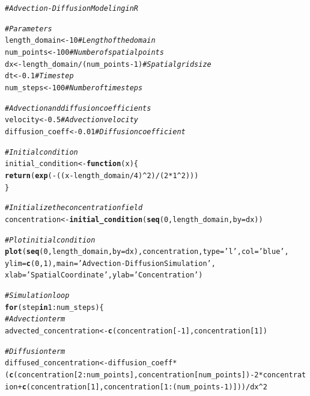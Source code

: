 \documentclass{tufte-handout}\usepackage[]{graphicx}\usepackage[]{xcolor}
\makeatletter
\newcommand{\hlnum}[1]{\textcolor[rgb]{0.686,0.059,0.569}{#1}}%
\newcommand{\hlstr}[1]{\textcolor[rgb]{0.192,0.494,0.8}{#1}}%
\newcommand{\hlcom}[1]{\textcolor[rgb]{0.678,0.584,0.686}{\textit{#1}}}%
\newcommand{\hlopt}[1]{\textcolor[rgb]{0,0,0}{#1}}%
\newcommand{\hlstd}[1]{\textcolor[rgb]{0.345,0.345,0.345}{#1}}%
\newcommand{\hlkwa}[1]{\textcolor[rgb]{0.161,0.373,0.58}{\textbf{#1}}}%
\newcommand{\hlkwb}[1]{\textcolor[rgb]{0.69,0.353,0.396}{#1}}%
\newcommand{\hlkwc}[1]{\textcolor[rgb]{0.333,0.667,0.333}{#1}}%
\newcommand{\hlkwd}[1]{\textcolor[rgb]{0.737,0.353,0.396}{\textbf{#1}}}%
\newenvironment{kframe}{%
 \def\at@end@of@kframe{}%
 \ifinner\ifhmode%
  \def\at@end@of@kframe{\end{minipage}}%
  \begin{minipage}{\columnwidth}%
 \fi\fi%
 \def\FrameCommand##1{\hskip\@totalleftmargin \hskip-\fboxsep
 \colorbox{shadecolor}{##1}\hskip-\fboxsep
     \hskip-\linewidth \hskip-\@totalleftmargin \hskip\columnwidth}%
 \MakeFramed {\advance\hsize-\width
   \@totalleftmargin\z@ \linewidth\hsize
   \@setminipage}}%
 {\par\unskip\endMakeFramed%
 \at@end@of@kframe}
\newenvironment{knitrout}{}{} %
\makeatother
\begin{document}
\begin{knitrout}
\color{fgcolor}\begin{kframe}
\begin{alltt}
\hlcom{# Advection-Diffusion Modeling in R}

\hlcom{# Parameters}
\hlstd{length_domain} \hlkwb{<-} \hlnum{10}  \hlcom{# Length of the domain}
\hlstd{num_points} \hlkwb{<-} \hlnum{100}    \hlcom{# Number of spatial points}
\hlstd{dx} \hlkwb{<-} \hlstd{length_domain} \hlopt{/} \hlstd{(num_points} \hlopt{-} \hlnum{1}\hlstd{)}  \hlcom{# Spatial grid size}
\hlstd{dt} \hlkwb{<-} \hlnum{0.1}            \hlcom{# Time step}
\hlstd{num_steps} \hlkwb{<-} \hlnum{100}     \hlcom{# Number of time steps}

\hlcom{# Advection and diffusion coefficients}
\hlstd{velocity} \hlkwb{<-} \hlnum{0.5}      \hlcom{# Advection velocity}
\hlstd{diffusion_coeff} \hlkwb{<-} \hlnum{0.01}  \hlcom{# Diffusion coefficient}

\hlcom{# Initial condition}
\hlstd{initial_condition} \hlkwb{<-} \hlkwa{function}\hlstd{(}\hlkwc{x}\hlstd{) \{}
  \hlkwd{return}\hlstd{(}\hlkwd{exp}\hlstd{(}\hlopt{-}\hlstd{((x} \hlopt{-} \hlstd{length_domain}\hlopt{/}\hlnum{4}\hlstd{)}\hlopt{^}\hlnum{2}\hlstd{)}\hlopt{/}\hlstd{(}\hlnum{2}\hlopt{*}\hlnum{1}\hlopt{^}\hlnum{2}\hlstd{)))}
\hlstd{\}}

\hlcom{# Initialize the concentration field}
\hlstd{concentration} \hlkwb{<-} \hlkwd{initial_condition}\hlstd{(}\hlkwd{seq}\hlstd{(}\hlnum{0}\hlstd{, length_domain,} \hlkwc{by} \hlstd{= dx))}

\hlcom{# Plot initial condition}
\hlkwd{plot}\hlstd{(}\hlkwd{seq}\hlstd{(}\hlnum{0}\hlstd{, length_domain,} \hlkwc{by} \hlstd{= dx), concentration,} \hlkwc{type} \hlstd{=} \hlstr{'l'}\hlstd{,} \hlkwc{col} \hlstd{=} \hlstr{'blue'}\hlstd{,}
     \hlkwc{ylim} \hlstd{=} \hlkwd{c}\hlstd{(}\hlnum{0}\hlstd{,} \hlnum{1}\hlstd{),} \hlkwc{main} \hlstd{=} \hlstr{'Advection-Diffusion Simulation'}\hlstd{,}
     \hlkwc{xlab} \hlstd{=} \hlstr{'Spatial Coordinate'}\hlstd{,} \hlkwc{ylab} \hlstd{=} \hlstr{'Concentration'}\hlstd{)}

\hlcom{# Simulation loop}
\hlkwa{for} \hlstd{(step} \hlkwa{in} \hlnum{1}\hlopt{:}\hlstd{num_steps) \{}
  \hlcom{# Advection term}
  \hlstd{advected_concentration} \hlkwb{<-} \hlkwd{c}\hlstd{(concentration[}\hlopt{-}\hlnum{1}\hlstd{], concentration[}\hlnum{1}\hlstd{])}

  \hlcom{# Diffusion term}
  \hlstd{diffused_concentration} \hlkwb{<-} \hlstd{diffusion_coeff} \hlopt{*} \hlstd{(}\hlkwd{c}\hlstd{(concentration[}\hlnum{2}\hlopt{:}\hlstd{num_points], concentration[num_points])} \hlopt{-} \hlnum{2} \hlopt{*} \hlstd{concentration} \hlopt{+} \hlkwd{c}\hlstd{(concentration[}\hlnum{1}\hlstd{], concentration[}\hlnum{1}\hlopt{:}\hlstd{(num_points}\hlopt{-}\hlnum{1}\hlstd{)]))} \hlopt{/} \hlstd{dx}\hlopt{^}\hlnum{2}


\end{alltt}
\end{kframe}
\end{knitrout}
\end{document}
